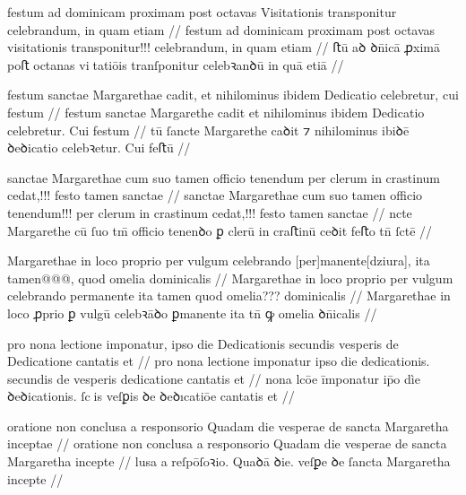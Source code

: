 \ex \bg
\gla
{}
festum ad dominicam proximam post octavas Visitationis transponitur celebrandum, in quam etiam
//
\glRekonstrukcja
{}
festum ad dominicam proximam post octavas visitationis transponitur!!! celebrandum, in quam etiam
//
\glU
{}
ﬅū aꝺ ꝺn̄icā ꝓximā poﬅ octanas vitatiōis tranſponitur celebꝛanꝺū in quā etiā
//
\endgl
\eg



\ex \bg
\gla
{}
festum sanctae Margarethae cadit,
et nihilominus ibidem Dedicatio celebretur, cui festum
//
\glRekonstrukcja
{}
festum sanctae Margarethe cadit
et nihilominus ibidem Dedicatio celebretur. Cui festum
//
\glU
{}
tū ſancte Margarethe caꝺit ⁊ nihilominus ibiꝺē ꝺeꝺicatio celebꝛetur. Cui feﬅū
//
\endgl
\eg



\ex \bg
\gla
{}
sanctae Margarethae cum suo tamen officio tenendum per clerum in crastinum cedat,!!!
festo tamen sanctae
//
\glRekonstrukcja
{}
sanctae Margarethae cum suo tamen officio tenendum!!! per clerum in crastinum cedat,!!!
festo tamen sanctae
//
\glU
{}
ncte Margarethe cū ſuo tm̄ oﬀicio tenenꝺo ꝑ clerū in craﬅinū ceꝺit feﬅo tn̄ ſctē
//
\endgl
\eg



\ex \bg
\gla
{}
Margarethae in loco proprio per vulgum celebrando
[per]manente[dziura], ita tamen@@@, quod omelia dominicalis
//
\glRekonstrukcja
{}
Margarethae in loco proprio per vulgum celebrando
permanente ita tamen quod omelia??? dominicalis
//
\glU
{}
Margarethae in loco ꝓprio ꝑ vulgū celebꝛāꝺo ꝑmanente ita tn̄ ꝙ omelia ꝺn̄icalis
//
\endgl
\eg



\ex \bg
\gla
{}
pro nona lectione
imponatur, ipso die Dedicationis secundis {} vesperis de Dedicatione cantatis et
//
\glRekonstrukcja
{}
pro nona lectione
imponatur ipso die dedicationis. secundis de vesperis {} dedicatione cantatis et
//
\glU
{}
 nona lcōe īmponatur ip̄o dìe ꝺeꝺicationis. ſcis {} veſꝑis  ꝺe ꝺeꝺıcatiōe cantatis et
//
\endgl
\eg



\ex \bg
\gla
{}
oratione non conclusa a responsorio Quadam die vesperae de
sancta Margaretha inceptae
//
\glRekonstrukcja
{}
oratione non conclusa a responsorio Quadam die vesperae de
sancta Margaretha incepte
//
\glU
{}
  lusa a reſpōſoꝛio. Quaꝺā ꝺie. veſꝑe ꝺe ſancta Margaretha incepte
//
\endgl
\eg



